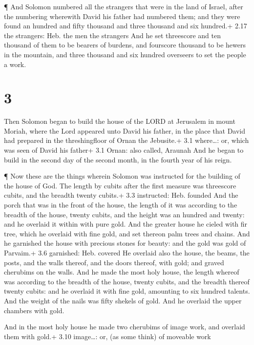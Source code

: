  ¶ And Solomon numbered all the strangers that were in the
land of Israel, after the numbering wherewith David his father had
numbered them; and they were found an hundred and fifty thousand and
three thousand and six hundred.+ 2.17 the strangers: Heb. the men the
strangers  And he set threescore and ten thousand of them
to be bearers of burdens, and fourscore thousand to be hewers in the
mountain, and three thousand and six hundred overseers to set the people
a work.

\hypertarget{section-2}{%
\section{3}\label{section-2}}

 Then Solomon began to build the house of the LORD at
Jerusalem in mount Moriah, where the Lord appeared unto David his
father, in the place that David had prepared in the threshingfloor of
Ornan the Jebusite.+ 3.1 where\ldots: or, which was seen of David his
father+ 3.1 Ornan: also called, Araunah  And he began to
build in the second day of the second month, in the fourth year of his
reign.

 ¶ Now these are the things wherein Solomon was instructed
for the building of the house of God. The length by cubits after the
first measure was threescore cubits, and the breadth twenty cubits.+ 3.3
instructed: Heb. founded  And the porch that was in the
front of the house, the length of it was according to the breadth of the
house, twenty cubits, and the height was an hundred and twenty: and he
overlaid it within with pure gold.  And the greater house he
cieled with fir tree, which he overlaid with fine gold, and set thereon
palm trees and chains.  And he garnished the house with
precious stones for beauty: and the gold was gold of Parvaim.+ 3.6
garnished: Heb. covered  He overlaid also the house, the
beams, the posts, and the walls thereof, and the doors thereof, with
gold; and graved cherubims on the walls.  And he made the
most holy house, the length whereof was according to the breadth of the
house, twenty cubits, and the breadth thereof twenty cubits: and he
overlaid it with fine gold, amounting to six hundred talents.
 And the weight of the nails was fifty shekels of gold. And
he overlaid the upper chambers with gold.

 And in the most holy house he made two cherubims of image
work, and overlaid them with gold.+ 3.10 image\ldots: or, (as some
think) of moveable work

